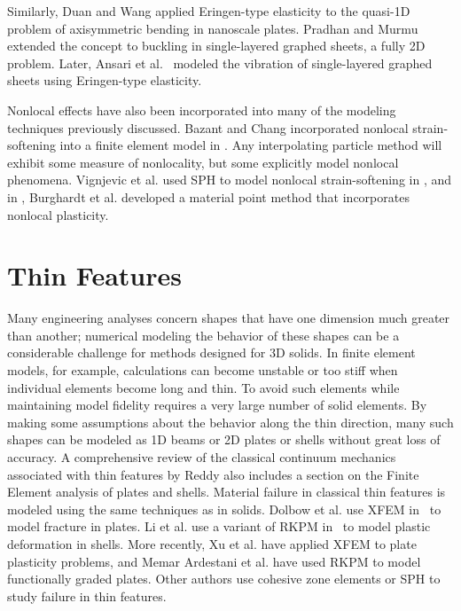 Similarly, Duan and Wang \cite{duan2007exact} applied Eringen-type elasticity to the quasi-1D problem of axisymmetric bending in nanoscale plates.
Pradhan and Murmu~\cite{pradhan2009small} extended the concept to buckling in single-layered graphed sheets, a fully 2D problem.
Later, Ansari et al.~\cite{ansari2010nonlocal} modeled the vibration of single-layered graphed sheets using Eringen-type elasticity.

Nonlocal effects have also been incorporated into many of the modeling techniques previously discussed.
Bazant and Chang incorporated nonlocal strain-softening into a finite element model in \cite{bazant1987nonlocal}.
Any interpolating particle method will exhibit some measure of nonlocality, but some explicitly model nonlocal phenomena.
Vignjevic et al. used SPH to model nonlocal strain-softening in \cite{vignjevic2014sph}, and in \cite{burghardt2012nonlocal}, Burghardt et al. developed a material point method that incorporates nonlocal plasticity.

\section{Thin Features}
Many engineering analyses concern shapes that have one dimension much greater than another; numerical modeling the behavior of these shapes can be a considerable challenge for methods designed for 3D solids. 
In finite element models, for example, calculations can become unstable or too stiff when individual elements become long and thin. 
To avoid such elements while maintaining model fidelity requires a very large number of solid elements. 
By making some assumptions about the behavior along the thin direction, many such shapes can be modeled as 1D beams or 2D plates or shells without great loss of accuracy.
A comprehensive review of the classical continuum mechanics associated with thin features by Reddy \cite{reddy2007theory} also includes a section on the Finite Element analysis of plates and shells.
Material failure in classical thin features is modeled using the same techniques as in solids.
Dolbow et al. use XFEM in~\cite{dolbow2000modeling} to model fracture in plates.
Li et al. use a variant of RKPM in~\cite{li2000numerical} to model plastic deformation in shells.
More recently, Xu et al. have applied XFEM to plate plasticity problems\cite{xu2013xfem}, and Memar Ardestani et al. have used RKPM to model functionally graded plates\cite{memar2014analysis}.
Other authors use cohesive zone elements\cite{li2002analysis} or SPH\cite{maurel2008sph} to study failure in thin features.
%


